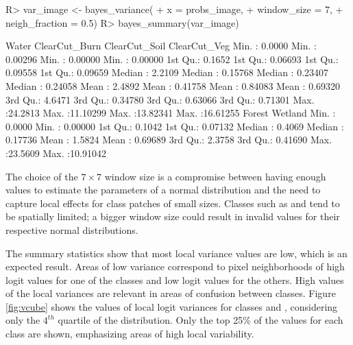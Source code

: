 \documentclass[
  shortnames]{jss}
\begin{document}
\begin{CodeChunk}
\begin{CodeInput}
R> var_image <- bayes_variance(
+     x = probs_image,
+     window_size = 7,
+     neigh_fraction = 0.5)
R> bayes_summary(var_image)
\end{CodeInput}
\begin{CodeOutput}
 Water             ClearCut_Burn      ClearCut_Soil      ClearCut_Veg      
 Min.   : 0.0000   Min.   : 0.00296   Min.   : 0.00000   Min.   : 0.00000  
 1st Qu.: 0.1652   1st Qu.: 0.06693   1st Qu.: 0.09558   1st Qu.: 0.09659  
 Median : 2.2109   Median : 0.15768   Median : 0.23407   Median : 0.24058  
 Mean   : 2.4892   Mean   : 0.41758   Mean   : 0.84083   Mean   : 0.69320  
 3rd Qu.: 4.6471   3rd Qu.: 0.34780   3rd Qu.: 0.63066   3rd Qu.: 0.71301  
 Max.   :24.2813   Max.   :11.10299   Max.   :13.82341   Max.   :16.61255  
 Forest            Wetland           
 Min.   : 0.0000   Min.   : 0.00000  
 1st Qu.: 0.1042   1st Qu.: 0.07132  
 Median : 0.4069   Median : 0.17736  
 Mean   : 1.5824   Mean   : 0.69689  
 3rd Qu.: 2.3758   3rd Qu.: 0.41690  
 Max.   :23.5609   Max.   :10.91042  
\end{CodeOutput}
\end{CodeChunk}

The choice of the \(7 \times 7\) window size is a compromise between having enough values to
estimate the parameters of a normal distribution and the need to capture local effects
for class patches of small sizes. Classes such as  and 
tend to be spatially limited; a bigger window size could result in invalid values for
their respective normal distributions.

The summary statistics show that most local variance values are low, which is an expected result. Areas of low variance correspond to pixel neighborhoods of high logit values for one of the classes and low logit values for the others. High values of the local variances are relevant in areas of confusion between classes. Figure \ref{fig:vcube} shows the values of local logit variances for classes  and , considering only the \(4^{th}\) quartile of the distribution. Only the top 25\% of the values for each class are shown, emphasizing areas of high local variability.
\end{document}
